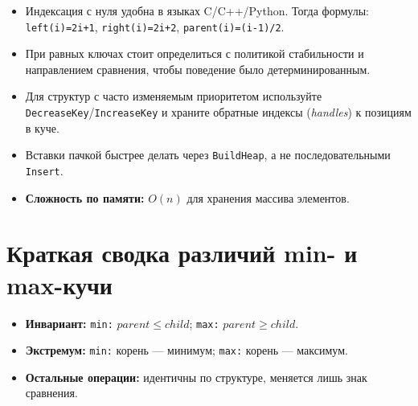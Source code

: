 \documentclass[12pt,a4paper]{article}
\begin{document}
\begin{itemize}[noitemsep, topsep=2pt]
  \item Индексация с нуля удобна в языках C/C++/Python. Тогда формулы: \texttt{left(i)=2i+1}, \texttt{right(i)=2i+2}, \texttt{parent(i)=(i-1)/2}.
  \item При равных ключах стоит определиться с политикой стабильности и направлением сравнения, чтобы поведение было детерминированным.
  \item Для структур с часто изменяемым приоритетом используйте \texttt{DecreaseKey}/\texttt{IncreaseKey} и храните обратные индексы (\emph{handles}) к позициям в куче.
  \item Вставки пачкой быстрее делать через \texttt{BuildHeap}, а не последовательными \texttt{Insert}.
  \item \textbf{Сложность по памяти:} $O(n)$ для хранения массива элементов.
\end{itemize}

\section{Краткая сводка различий min- и max-кучи}

\begin{itemize}[noitemsep, topsep=2pt]
  \item \textbf{Инвариант:} \; \texttt{min:} $parent \le child$; \; \texttt{max:} $parent \ge child$.
  \item \textbf{Экстремум:} \; \texttt{min:} корень --- минимум; \; \texttt{max:} корень --- максимум.
  \item \textbf{Остальные операции:} идентичны по структуре, меняется лишь знак сравнения.
\end{itemize}

\vfill
\end{document}
